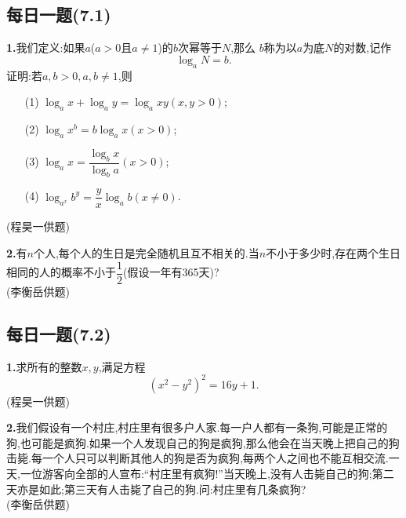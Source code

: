 \documentclass{article}
\begin{document}
{\centering\subsection*{每日一题(7.1)}}
\par\textbf{1.}我们定义:如果$a$($a>0$且$a\neq 1$)的$b$次幂等于$N$,那么 $b$称为以$a$为底$N$的对数,记作
\[\log_aN=b.\]
证明:若$a,b>0,a,b\neq 1$,则
\begin{itemize}
	\item[(1)]$\log_ax+\log_ay=\log_axy$\quad$(x,y>0)$;
	\item[(2)]$\log_ax^b=b\log_ax$\quad$(x>0)$;
	\item[(3)]$\log_ax=\dfrac{\log_bx}{\log_ba}$\quad$(x>0)$;
	\item[(4)]$\log_{a^x}b^y=\dfrac{y}{x}\log_ab$\quad$(x\neq 0)$.
\end{itemize}
{(程昊一供题)}\\
\par\textbf{2.}有$n$个人,每个人的生日是完全随机且互不相关的.当$n$不小于多少时,存在两个生日相同的人的概率不小于$\dfrac{1}{2}$(假设一年有365天)?\\
{(李衡岳供题)}\\

{\centering\subsection*{每日一题(7.2)}}
\textbf{1.}求所有的整数$x,y$,满足方程
\[(x^2-y^2)^2=16y+1.\]
{(程昊一供题)}\\
\par\textbf{2.}我们假设有一个村庄,村庄里有很多户人家.每一户人都有一条狗,可能是正常的狗,也可能是疯狗.如果一个人发现自己的狗是疯狗,那么他会在当天晚上把自己的狗击毙.每一个人只可以判断其他人的狗是否为疯狗,每两个人之间也不能互相交流.一天,一位游客向全部的人宣布:“村庄里有疯狗!”当天晚上,没有人击毙自己的狗;第二天亦是如此;第三天有人击毙了自己的狗.问:村庄里有几条疯狗?\\
{(李衡岳供题)}\\
\end{document}
